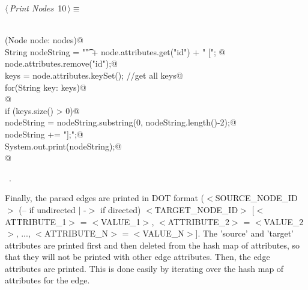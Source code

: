 \documentclass[a4paper]{report}
\begin{document}
\begin{flushleft} \small
\begin{minipage}{\linewidth}\label{scrap10}\raggedright\small
{} $\langle\,${\itshape Print Nodes}\nobreak\ {\footnotesize {10}}$\,\rangle\equiv$
\vspace{-1ex}
\begin{list}{}{} \item
\mbox{}\verb@@\\
\mbox{}\verb@for (Node node: nodes){@\\
\mbox{}\verb@        String nodeString = "\t" + node.attributes.get("id") + " ["; @\\
\mbox{}\verb@        node.attributes.remove("id");@\\
\mbox{}\verb@        keys = node.attributes.keySet();  //get all keys@\\
\mbox{}\verb@        for(String key: keys)@\\
\mbox{}   @\\
\mbox{}\verb@        if (keys.size() > 0)@\\
\mbox{}\verb@                nodeString = nodeString.substring(0, nodeString.length()-2);@\\
\mbox{}\verb@        nodeString += "];\n";@\\
\mbox{}\verb@        System.out.print(nodeString);@\\
\mbox{}\verb@}@\\
\mbox{}\verb@@{\NWsep}
\end{list}
\vspace{-1.5ex}
\footnotesize
\begin{list}{}{\setlength{\itemsep}{-\parsep}\setlength{\itemindent}{-\leftmargin}}
\item \NWtxtMacroRefIn\ .

\item{}
\end{list}
\end{minipage}\vspace{4ex}
\end{flushleft}
Finally, the parsed edges are printed in DOT format ($<$SOURCE\_NODE\_ID$>$ (-- if undirected $|$ -$>$ if directed) $<$TARGET\_NODE\_ID$>$ [$<$ATTRIBUTE\_1$>$ = $<$VALUE\_1$>$, $<$ATTRIBUTE\_2$>$ = $<$VALUE\_2$>$, ..., $<$ATTRIBUTE\_N$>$ = $<$VALUE\_N$>$]. The 'source' and 'target' attributes are printed first and then deleted from the hash map of attributes, so that they will not be printed with other edge attributes. Then, the edge attributes are printed. This is done easily by iterating over the hash map of attributes for the edge. 
\end{document}
